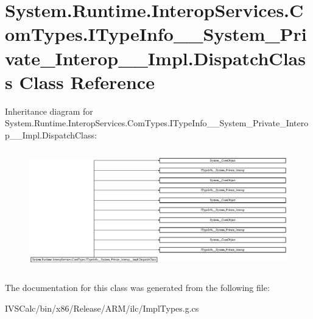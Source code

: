 \hypertarget{class_system_1_1_runtime_1_1_interop_services_1_1_com_types_1_1_i_type_info_____system___private58eb5d630bd48a73a25f2b501a335028}{}\section{System.\+Runtime.\+Interop\+Services.\+Com\+Types.\+I\+Type\+Info\+\_\+\+\_\+\+System\+\_\+\+Private\+\_\+\+Interop\+\_\+\+\_\+\+Impl.\+Dispatch\+Class Class Reference}
\label{class_system_1_1_runtime_1_1_interop_services_1_1_com_types_1_1_i_type_info_____system___private58eb5d630bd48a73a25f2b501a335028}
Inheritance diagram for System.\+Runtime.\+Interop\+Services.\+Com\+Types.\+I\+Type\+Info\+\_\+\+\_\+\+System\+\_\+\+Private\+\_\+\+Interop\+\_\+\+\_\+\+Impl.\+Dispatch\+Class\+:\begin{figure}[H]
\begin{center}
\leavevmode
\includegraphics[height=5.247019cm]{class_system_1_1_runtime_1_1_interop_services_1_1_com_types_1_1_i_type_info_____system___private58eb5d630bd48a73a25f2b501a335028}
\end{center}
\end{figure}


The documentation for this class was generated from the following file\+:\begin{DoxyCompactItemize}
\item 
I\+V\+S\+Calc/bin/x86/\+Release/\+A\+R\+M/ilc/Impl\+Types.\+g.\+cs\end{DoxyCompactItemize}
